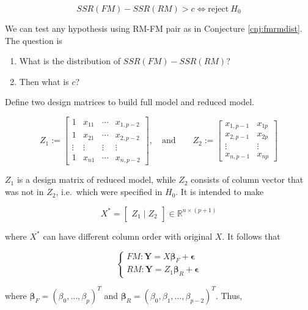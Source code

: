 \documentclass[]{book}
\providecommand{\tightlist}{%
  \setlength{\itemsep}{0pt}\setlength{\parskip}{0pt}}
\newcommand{\E}{\boldsymbol\epsilon}
\theoremstyle{definition}
\theoremstyle{definition}
\theoremstyle{definition}
\theoremstyle{remark}
\let\BeginKnitrBlock\begin \let\EndKnitrBlock\end
\begin{document}
\BeginKnitrBlock{conjecture}
\protect\hypertarget{cnj:fmrmdist}{}{\label{cnj:fmrmdist} }\[SSR(FM) - SSR(RM) > c \Leftrightarrow \text{reject}\: H_0\]
\EndKnitrBlock{conjecture}

We can test any hypothesis using RM-FM pair as in Conjecture \ref{cnj:fmrmdist}. The question is

\begin{enumerate}
\def\labelenumi{\arabic{enumi}.}
\tightlist
\item
  What is the distribution of \(SSR(FM) - SSR(RM)\)?
\item
  Then what is \(c\)?
\end{enumerate}

Define two design matrices to build full model and reduced model.

\[
Z_1 := \begin{bmatrix}
  1 & x_{11} & \cdots & x_{1, p - 2} \\
  1 & x_{21} & \cdots & x_{2, p - 2} \\
  \vdots & \vdots & \vdots & \vdots \\
  1 & x_{n1} & \cdots & x_{n,p - 2}
\end{bmatrix}, \quad \text{and} \qquad Z_2 := \begin{bmatrix}
  x_{1, p - 1} & x_{1p} \\
  x_{2, p - 1} & x_{2p} \\
  \vdots & \vdots \\
  x_{n, p - 1} & x_{np}
\end{bmatrix}
\]

\(Z_1\) is a design matrix of reduced model, while \(Z_2\) consists of column vector that was not in \(Z_2\), i.e.~which were specified in \(H_0\). It is intended to make

\[
X^{\ast} = \begin{bmatrix}
  Z_1 \mid Z_2
\end{bmatrix} \in \mathbb{R}^{n \times (p + 1)}
\]

where \(X^{\ast}\) can have different column order with original \(X\). It follows that

\[
\begin{cases}
  FM: \mathbf{Y} = X\boldsymbol\beta_F + \E \\
  RM: \mathbf{Y} = Z_1 \boldsymbol\beta_R + \E
\end{cases}
\]

where \(\boldsymbol\beta_F = (\beta_0, \ldots, \beta_p)^T\) and \(\boldsymbol\beta_R = (\beta_0, \beta_1, \ldots, \beta_{p - 2})^T\). Thus,
\end{document}
